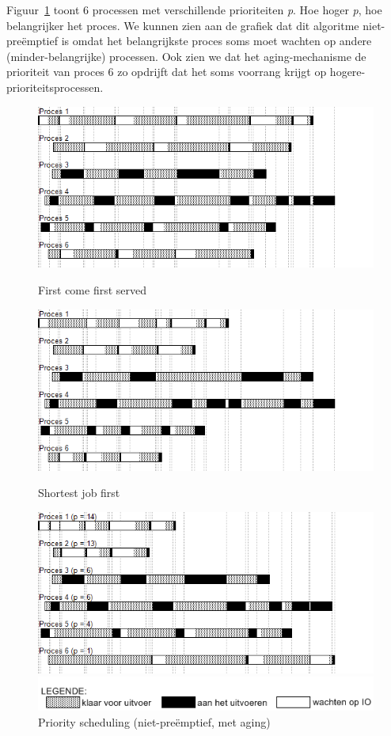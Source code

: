 Figuur~\ref{fig:schedpsnopre} toont 6 processen met verschillende prioriteiten \emph{p}. Hoe hoger \emph{p}, hoe belangrijker het proces. We kunnen zien aan de grafiek dat dit algoritme niet-pre\"emptief is omdat het belangrijkste proces soms moet wachten op andere (minder-belangrijke) processen. Ook zien we dat het aging-mechanisme de prioriteit van proces 6 zo opdrijft dat het soms voorrang krijgt op hogere-prioriteitsprocessen.

\begin{figure}
\centering
  \includegraphics[width=\linewidth]{images/schedule_fcfs.png}
  \caption{First come first served}
  \label{fig:schedfcfs}
  \centering
  \includegraphics[width=\linewidth]{images/schedule_sjf.png}
  \caption{Shortest job first}
  \label{fig:schedsjf}
  \centering
  \includegraphics[width=\linewidth]{images/schedule_ps_noqua_age.png}
  \caption{Priority scheduling (niet-pre\"emptief, met aging)}
  \label{fig:schedpsnopre}
  \includegraphics[width=0.8\linewidth]{images/legende.png}
\end{figure}

